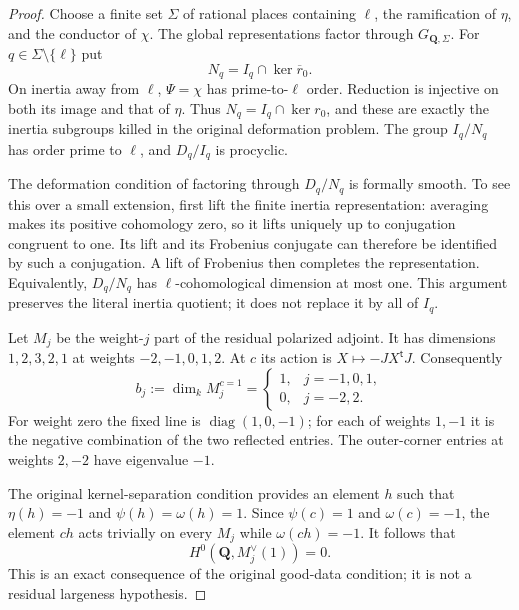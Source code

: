 \begin{proof}
Choose a finite set $\Sigma$ of rational places containing $\ell$,
the ramification of $\eta$, and the conductor of $\chi$.
The global representations factor through $G_{\mathbf Q,\Sigma}$.
For $q\in\Sigma\setminus\{\ell\}$ put
\[
             N_q=I_q\cap\ker\overline r_0.
\]
On inertia away from $\ell$, $\Psi=\chi$ has prime-to-$\ell$
order.  Reduction is injective on both its image and that of $\eta$.
Thus $N_q=I_q\cap\ker r_0$, and these are exactly the inertia
subgroups killed in the original deformation problem.  The group
$I_q/N_q$ has order prime to $\ell$, and $D_q/I_q$ is procyclic.

The deformation condition of factoring through $D_q/N_q$ is formally
smooth.  To see this over a small extension, first lift the finite
inertia representation: averaging makes its positive cohomology
zero, so it lifts uniquely up to conjugation congruent to one.
Its lift and its Frobenius conjugate can therefore be identified by
such a conjugation.  A lift of Frobenius then completes the
representation.  Equivalently, $D_q/N_q$ has $\ell$-cohomological
dimension at most one.  This argument preserves the literal inertia
quotient; it does not replace it by all of $I_q$.

Let $M_j$ be the weight-$j$ part of the residual polarized adjoint.
It has dimensions $1,2,3,2,1$ at weights $-2,-1,0,1,2$.
At $c$ its action is $X\mapsto-JX^{\mathsf t}J$.  Consequently
\[
 b_j:=\dim_kM_j^{c=1}
       =\begin{cases}1,&j=-1,0,1,\\0,&j=-2,2.\end{cases}
                                                               \tag{RP3}
\]
For weight zero the fixed line is
$\operatorname{diag}(1,0,-1)$; for each of weights $1,-1$ it is
the negative combination of the two reflected entries.  The
outer-corner entries at weights $2,-2$ have eigenvalue $-1$.

The original kernel-separation condition provides an element $h$
such that $\eta(h)=-1$ and $\psi(h)=\omega(h)=1$.  Since
$\psi(c)=1$ and $\omega(c)=-1$, the element $ch$ acts trivially
on every $M_j$ while $\omega(ch)=-1$.  It follows that
\[
                  H^0(\mathbf Q,M_j^\vee(1))=0.               \tag{RP4}
\]
This is an exact consequence of the original good-data condition;
it is not a residual largeness hypothesis.


\end{proof}
